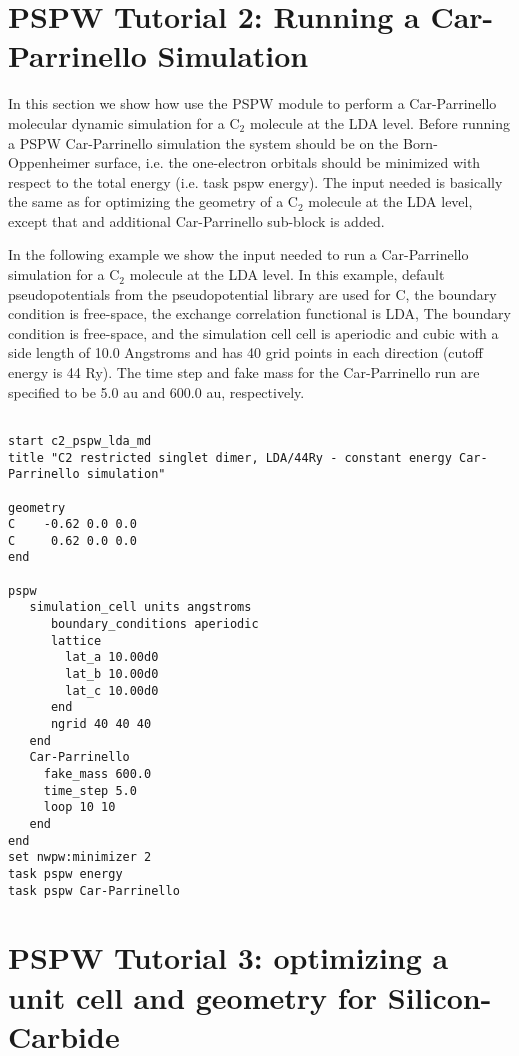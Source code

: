 \normalsize
\section{PSPW Tutorial 2: Running a Car-Parrinello Simulation}
\label{sec:pspw_cp}
\normalsize

In this section we show how use the PSPW module to perform a Car-Parrinello
molecular dynamic simulation for a C$_2$ molecule at the LDA level.  
Before running a PSPW Car-Parrinello  simulation the system should be
on the Born-Oppenheimer surface, i.e. the one-electron orbitals should be minimized 
with respect to the total energy (i.e. task pspw energy).  The input needed
is basically the same as for optimizing the geometry of a C$_2$ molecule at the LDA level,
except that and additional Car-Parrinello sub-block is added.  

In the following example we show the input needed to run a Car-Parrinello simulation
for a C$_2$ molecule at the LDA level.  In this example, default pseudopotentials
from the pseudopotential library are used for C, the boundary condition is free-space, 
the exchange correlation functional is LDA, The boundary condition is free-space, and 
the simulation cell cell is aperiodic and cubic with a side length of 10.0 Angstroms and has
40 grid points in each direction (cutoff energy is 44 Ry).  The time step and fake mass
for the Car-Parrinello run are specified to be 5.0 au and 600.0 au, respectively.  

\begin{verbatim}
         
start c2_pspw_lda_md
title "C2 restricted singlet dimer, LDA/44Ry - constant energy Car-Parrinello simulation"

geometry  
C    -0.62 0.0 0.0
C     0.62 0.0 0.0
end
       
pspw
   simulation_cell units angstroms
      boundary_conditions aperiodic
      lattice
        lat_a 10.00d0
        lat_b 10.00d0
        lat_c 10.00d0
      end
      ngrid 40 40 40
   end
   Car-Parrinello
     fake_mass 600.0
     time_step 5.0
     loop 10 10
   end
end
set nwpw:minimizer 2
task pspw energy
task pspw Car-Parrinello
\end{verbatim}


\normalsize
\section{PSPW Tutorial 3: optimizing a unit cell and geometry for Silicon-Carbide}
\label{sec:pspw_unitcell_optimization}

